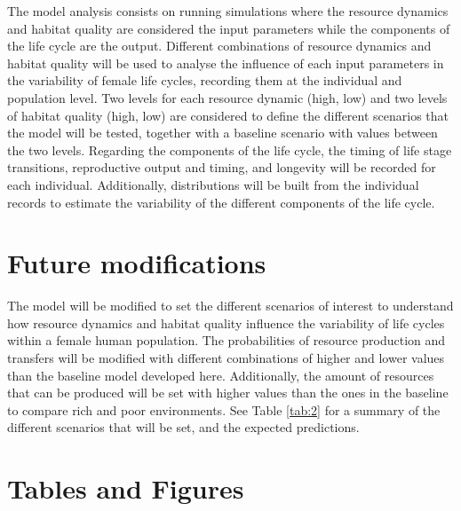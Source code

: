 \documentclass{article}
\begin{document}
The model analysis consists on running simulations where the resource dynamics and habitat quality are considered the input parameters while the components of the life cycle are the output. Different combinations of resource dynamics and habitat quality will be used to analyse the influence of each input parameters in the variability of female life cycles, recording them at the individual and population level. Two levels for each resource dynamic (high, low) and two levels of habitat quality (high, low) are considered to define the different scenarios that the model will be tested, together with a baseline scenario with values between the two levels. Regarding the components of the life cycle, the timing of life stage transitions, reproductive output and timing, and longevity will be recorded for each individual. Additionally, distributions will be built from the individual records to estimate the variability of the different components of the life cycle.

\section{Future modifications}

The model will be modified to set the different scenarios of interest to understand how resource dynamics and habitat quality influence the variability of life cycles within a female human population. The probabilities of resource production and transfers will be modified with different combinations of higher and lower values than the baseline model developed here. Additionally, the amount of resources that can be produced will be set with higher values than the ones in the baseline to compare rich and poor environments. See Table \ref{tab:2} for a summary of the different scenarios that will be set, and the expected predictions.

\section{Tables and Figures}
\end{document}
